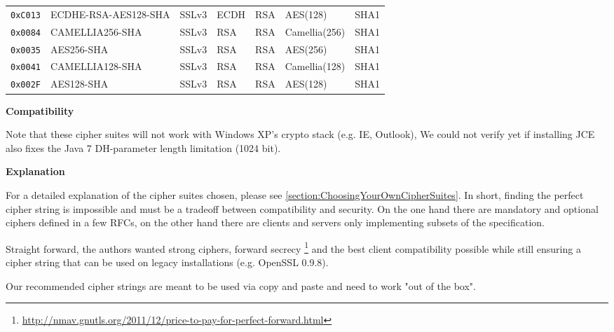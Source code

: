 \begin{center}
\begin{tabular}{lllllll}
\verb|0xC013| & ECDHE-RSA-AES128-SHA        & SSLv3            & ECDH           & RSA           & AES(128)        & SHA1         \\
\verb|0x0084| & CAMELLIA256-SHA             & SSLv3            & RSA            & RSA           & Camellia(256)   & SHA1         \\
\verb|0x0035| & AES256-SHA                  & SSLv3            & RSA            & RSA           & AES(256)        & SHA1         \\
\verb|0x0041| & CAMELLIA128-SHA             & SSLv3            & RSA            & RSA           & Camellia(128)   & SHA1         \\
\verb|0x002F| & AES128-SHA                  & SSLv3            & RSA            & RSA           & AES(128)        & SHA1         \\
\bottomrule
\end{tabular}
\end{center}

\textbf{Compatibility}

Note that these cipher suites will not work with Windows XP's crypto stack (e.g. IE, Outlook), 
We could not verify yet if installing JCE also fixes the Java 7
DH-parameter length limitation (1024 bit). 

\textbf{Explanation}

For a detailed explanation of the cipher suites chosen, please see
\ref{section:ChoosingYourOwnCipherSuites}. In short, finding the perfect cipher
string is impossible and must be a tradeoff between compatibility and security. 
On the one hand there are mandatory and optional ciphers defined in a few RFCs, 
on the other hand there are clients and servers only implementing subsets of the 
specification.

Straight forward, the authors wanted strong ciphers, forward secrecy
\footnote{\url{http://nmav.gnutls.org/2011/12/price-to-pay-for-perfect-forward.html}}
and the best client compatibility possible while still ensuring a cipher string that can be
used on legacy installations (e.g. OpenSSL 0.9.8). 

Our recommended cipher strings are meant to be used via copy and paste and need to work
"out of the box".

